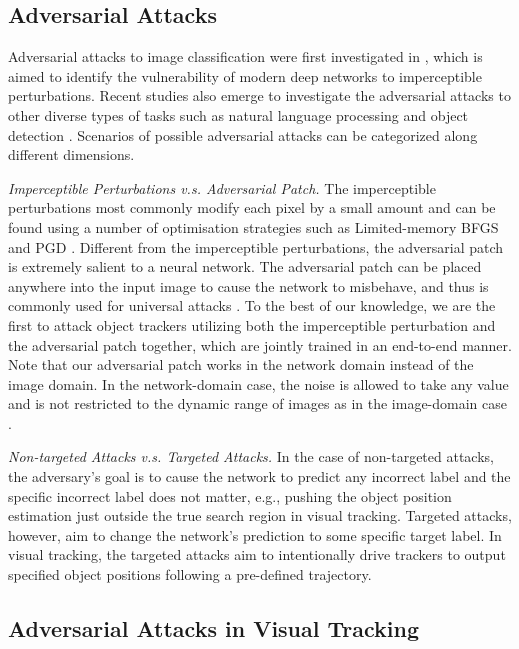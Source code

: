\documentclass{article}
\newcommand{\eg}{e.g.}
\begin{document}
\subsection{Adversarial Attacks}

Adversarial attacks to image classification were first investigated in \cite{intriguing}, which is aimed to identify the vulnerability of modern deep networks to imperceptible perturbations. 
Recent studies also emerge to investigate the adversarial attacks to other diverse types of tasks such as natural language processing \cite{generating} and object detection \cite{wei2019transferable}.
Scenarios of possible adversarial attacks can be categorized along different dimensions.

\textit{Imperceptible Perturbations v.s. Adversarial Patch.} The imperceptible perturbations most commonly modify each pixel by a small amount and can be found using a number of optimisation strategies such as Limited-memory BFGS \cite{intriguing} and PGD \cite{PGD}.
Different from the imperceptible perturbations, the adversarial patch is extremely salient to a neural network. The adversarial patch can be placed anywhere into the input image to cause the network to misbehave, and thus is commonly used for universal attacks \cite{patch}.
To the best of our knowledge, we are the first to attack object trackers utilizing both the imperceptible perturbation and the adversarial patch together, which are jointly trained in an end-to-end manner.
Note that our adversarial patch works in the network domain instead of the image domain. In the network-domain case, the noise is allowed to take any value and is not restricted to the dynamic range of images as in the image-domain case \cite{karmon2018lavan}.

\textit{Non-targeted Attacks v.s. Targeted Attacks.} In the case of non-targeted attacks, the adversary's goal is to cause the network to predict any incorrect label and the specific incorrect label does not matter, \eg, pushing the object position estimation just outside the true search region in visual tracking.
Targeted attacks, however, aim to change the network's prediction to some specific target label. In visual tracking, the targeted attacks aim to intentionally drive trackers to output specified object positions following a pre-defined trajectory.

\subsection{Adversarial Attacks in Visual Tracking}
\end{document}
